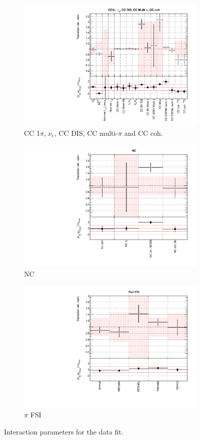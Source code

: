 \begin{figure}[!htbp]
\begin{subfigure}{0.49\textwidth}
  \centering
  \includegraphics[width=0.9\linewidth]{figs/datxsec3}
  \caption{CC 1$\pi$, $\nu_e$, CC DIS, CC multi-$\pi$ and CC coh.}
\end{subfigure}
\begin{subfigure}{0.45\textwidth}
  \centering
  \includegraphics[width=0.9\linewidth]{figs/datxsec4}
  \caption{NC}
\end{subfigure}
\begin{subfigure}{0.49\textwidth}
  \centering
  \includegraphics[width=0.9\linewidth]{figs/datxsec5}
  \caption{$\pi$ FSI}
\end{subfigure}
\caption{Interaction parameters for the data fit.}
\label{fig:datxsecapp}
\end{figure}

